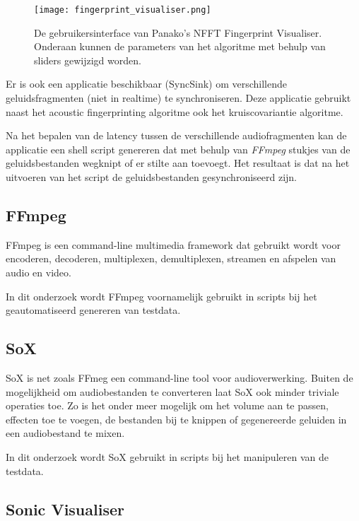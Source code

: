 \begin{figure}[!h]
	\captionsetup{width=0.8\textwidth}
	\caption[Gebruikersinterface van Audacity]{De gebruikersinterface van Panako's NFFT Fingerprint Visualiser. Onderaan kunnen de parameters van het algoritme met behulp van sliders gewijzigd worden.}
	\centering
	\advance\parskip0.3cm
	\texttt{[image: fingerprint\_visualiser.png]}
	\label{fingerprint_visualiser}
\end{figure}

Er is ook een applicatie beschikbaar (SyncSink) om verschillende geluidsfragmenten (niet in realtime) te synchroniseren. Deze applicatie gebruikt naast het acoustic fingerprinting algoritme ook het kruiscovariantie algoritme. 

Na het bepalen van de latency tussen de verschillende audiofragmenten kan de applicatie een shell script genereren dat met behulp van \textit{FFmpeg} stukjes van de geluidsbestanden wegknipt of er stilte aan toevoegt. Het resultaat is dat na het uitvoeren van het script de geluidsbestanden gesynchroniseerd zijn.

\subsection{FFmpeg}

FFmpeg is een command-line multimedia framework dat gebruikt wordt voor encoderen, decoderen, multiplexen, demultiplexen, streamen en afspelen van audio en video. \cite{kollarconfiguration}

In dit onderzoek wordt FFmpeg voornamelijk gebruikt in scripts bij het geautomatiseerd genereren van testdata.

\subsection{SoX}

SoX is net zoals FFmeg een command-line tool voor audioverwerking. Buiten de mogelijkheid om audiobestanden te converteren laat SoX ook minder triviale operaties toe. Zo is het onder meer mogelijk om het volume aan te passen, effecten toe te voegen, de bestanden bij te knippen of gegenereerde geluiden in een audiobestand te mixen.
\cite{barras2012sox}

In dit onderzoek wordt SoX gebruikt in scripts bij het manipuleren van de testdata.

\subsection{Sonic Visualiser}

